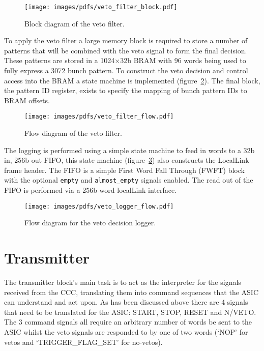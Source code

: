 \documentclass[]{article}
\begin{document}
    \begin{figure}[htbp]
        \centering
            \texttt{[image: images/pdfs/veto\_filter\_block.pdf]}
        \caption{Block diagram of the veto filter.}
        \label{fig:veto_filter_block}
    \end{figure}
    
    To apply the veto filter a large memory block is required to store a number of patterns that will be combined with the veto signal to form the final decision. These patterns are stored in a 1024\( \times \)32b BRAM with 96 words being used to fully express a 3072 bunch pattern. To construct the veto decision and control access into the BRAM a state machine is implemented (figure~\ref{fig:veto_filter_flow}). The final block, the pattern ID register, exists to specify the mapping of bunch pattern IDs to BRAM offsets.
    
    \begin{figure}[htbp]
        \centering
            \texttt{[image: images/pdfs/veto\_filter\_flow.pdf]}
        \caption{Flow diagram of the veto filter.}
        \label{fig:veto_filter_flow}
    \end{figure}
    
    The logging is performed using a simple state machine to feed in words to a 32b in, 256b out FIFO, this state machine (figure~\ref{fig:veto_logger_flow}) also constructs the LocalLink frame header. The FIFO is a simple First Word Fall Through (FWFT) block with the optional \texttt{empty} and \texttt{almost\_empty} signals enabled. The read out of the FIFO is performed via a 256b-word localLink interface.
    
    \begin{figure}[htbp]
        \centering
            \texttt{[image: images/pdfs/veto\_logger\_flow.pdf]}
        \caption{Flow diagram for the veto decision logger.}
        \label{fig:veto_logger_flow}
    \end{figure}

    \section{Transmitter} %
    \label{sec:transmitter}
    The transmitter block's main task is to act as the interpreter for the signals received from the CCC, translating them into command sequences that the ASIC can understand and act upon. As has been discussed above there are 4 signals that need to be translated for the ASIC: START, STOP, RESET and N/VETO. The 3 command signals all require an arbitrary number of words be sent to the ASIC whilst the veto signals are responded to by one of two words (`NOP' for vetos and `TRIGGER\_FLAG\_SET' for no-vetos).
    
\end{document}
